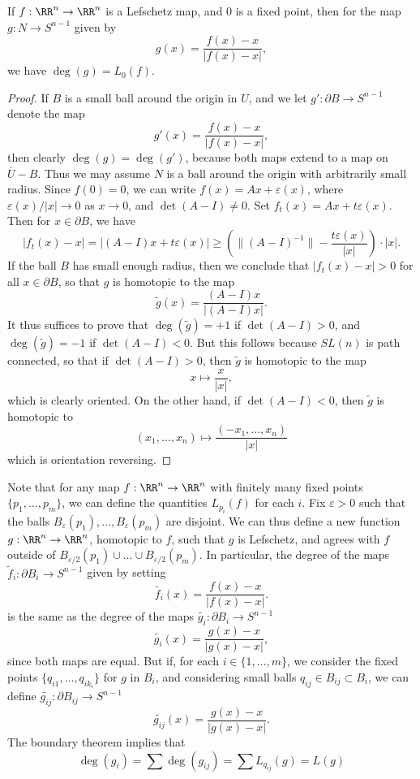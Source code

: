 \begin{theorem}
    If $f: \RR^n \to \RR^n$ is a Lefschetz map, and $0$ is a fixed point, then for the map $g: N \to S^{n-1}$ given by
    \[ g(x) = \frac{f(x) - x}{|f(x) - x|}, \]
    we have $\deg(g) = L_0(f)$.
\end{theorem}
\begin{proof}
    If $B$ is a small ball around the origin in $U$, and we let $g': \partial B \to S^{n-1}$ denote the map
    \[ g'(x) = \frac{f(x) - x}{|f(x) - x|}, \]
    then clearly $\deg(g) = \deg(g')$, because both maps extend to a map on $\overline{U} - B$. Thus we may assume $N$ is a ball around the origin with arbitrarily small radius. Since $f(0) = 0$, we can write $f(x) = Ax + \varepsilon(x)$, where $\varepsilon(x)/|x| \to 0$ as $x \to 0$, and $\det(A - I) \neq 0$. Set $f_t(x) = Ax + t \varepsilon(x)$. Then for $x \in \partial B$, we have
    \[ |f_t(x) - x| = |(A - I)x + t \varepsilon(x)| \geq \left( \| (A - I)^{-1} \| - \frac{t \varepsilon(x)}{|x|} \right) \cdot |x|. \]
    If the ball $B$ has small enough radius, then we conclude that $|f_t(x) - x| > 0$ for all $x \in \partial B$, so that $g$ is homotopic to the map
    \[ \tilde{g}(x) = \frac{(A - I)x}{|(A - I) x|}. \]
    It thus suffices to prove that $\deg(\tilde{g}) = +1$ if $\det(A - I) > 0$, and $\deg(\tilde{g}) = -1$ if $\det(A - I) < 0$. But this follows because $SL(n)$ is path connected, so that if $\det(A - I) > 0$, then $\tilde{g}$ is homotopic to the map
    \[ x \mapsto \frac{x}{|x|}, \]
    which is clearly oriented. On the other hand, if $\det(A - I) < 0$, then $\tilde{g}$ is homotopic to
    \[ (x_1,\dots,x_n) \mapsto \frac{(-x_1,\dots,x_n)}{|x|} \]
    which is orientation reversing.
\end{proof}

Note that for any map $f: \RR^n \to \RR^n$ with finitely many fixed points $\{ p_1, \dots, p_m \}$, we can define the quantities $L_{p_i}(f)$ for each $i$. Fix $\varepsilon > 0$ such that the balls $B_\varepsilon(p_1), \dots, B_\varepsilon(p_m)$ are disjoint. We can thus define a new function $g: \RR^n \to \RR^n$, homotopic to $f$, such that $g$ is Lefschetz, and agrees with $f$ outside of $B_{\varepsilon/2}(p_1) \cup \dots \cup B_{\varepsilon/2}(p_m)$. In particular, the degree of the maps $\tilde{f}_i: \partial B_i \to S^{n-1}$ given by setting
%
\[ \tilde{f_i}(x) = \frac{f(x) - x}{|f(x) - x|}. \]
%
is the same as the degree of the maps $\tilde{g_i}: \partial B_i \to S^{n-1}$
%
\[ \tilde{g_i}(x) = \frac{g(x) - x}{|g(x) - x|}, \]
%
since both maps are equal. But if, for each $i \in \{ 1, \dots, m \}$, we consider the fixed points $\{ q_{i1}, \dots, q_{ik_i} \}$ for $g$ in $B_i$, and considering small balls $q_{ij} \in B_{ij} \subset B_i$, we can define $\tilde{g_{ij}}: \partial B_{ij} \to S^{n-1}$
%
\[ \tilde{g_{ij}}(x) = \frac{g(x) - x}{|g(x) - x|}. \]
%
The boundary theorem implies that
%
\[ \deg(g_i) = \sum \deg(g_{ij}) = \sum L_{q_{ij}}(g) = L(g) \]

